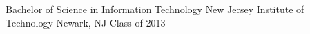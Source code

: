 

\begin{cventries}

	\cventry
	{Bachelor of Science in Information Technology} %
	{New Jersey Institute of Technology} %
	{Newark, NJ} %
	{Class of 2013} %
	{
		\begin{cvitems} %
		\end{cvitems}
	}


\end{cventries}
